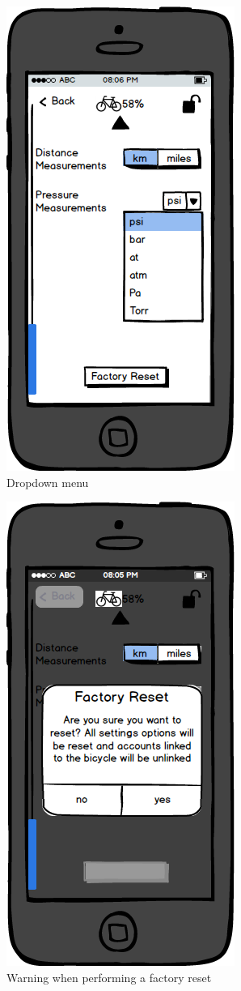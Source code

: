 \documentclass[a4paper]{report}
\begin{document}
\clearpage
\begin{figure}
\centering
\includegraphics[scale=0.9]{figures/prototype_2/settings_2_check}
\caption{Dropdown menu}
\end{figure}
\clearpage
\begin{figure}
\centering
\includegraphics[scale=0.9]{figures/prototype_2/factory_reset}
\caption{Warning when performing a factory reset}
\end{figure}
\end{document}
